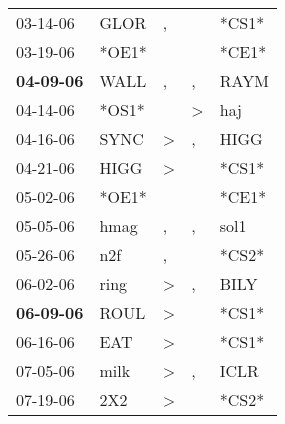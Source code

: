 \begin{supertabular}{p{0.07\textwidth}p{0.06\textwidth}p{0.02\textwidth}p{0.02\textwidth}p{0.06\textwidth}}
          03-14-06\textsuperscript{} &           GLOR\textsuperscript{} &                , &                  &                            *CS1* \\
          03-19-06\textsuperscript{} &                            *OE1* &                  &                  &                            *CE1* \\
 \textbf{04-09-06\textsuperscript{}} &           WALL\textsuperscript{} &                , &                , &           RAYM\textsuperscript{} \\
          04-14-06\textsuperscript{} &                            *OS1* &                  &     \textgreater &            haj\textsuperscript{} \\
          04-16-06\textsuperscript{} &           SYNC\textsuperscript{} &     \textgreater &                , &           HIGG\textsuperscript{} \\
          04-21-06\textsuperscript{} &           HIGG\textsuperscript{} &     \textgreater &                  &                            *CS1* \\
          05-02-06\textsuperscript{} &                            *OE1* &                  &                  &                            *CE1* \\
          05-05-06\textsuperscript{} &           hmag\textsuperscript{} &                , &                , &           sol1\textsuperscript{} \\
          05-26-06\textsuperscript{} &            n2f\textsuperscript{} &                , &                  &                            *CS2* \\
          06-02-06\textsuperscript{} &           ring\textsuperscript{} &     \textgreater &                , &           BILY\textsuperscript{} \\
 \textbf{06-09-06\textsuperscript{}} &           ROUL\textsuperscript{} &     \textgreater &                  &                            *CS1* \\
          06-16-06\textsuperscript{} &            EAT\textsuperscript{} &     \textgreater &                  &                            *CS1* \\
          07-05-06\textsuperscript{} &           milk\textsuperscript{} &     \textgreater &                , &           ICLR\textsuperscript{} \\
          07-19-06\textsuperscript{} &            2X2\textsuperscript{} &     \textgreater &                  &                            *CS2* \\

\end{supertabular}
